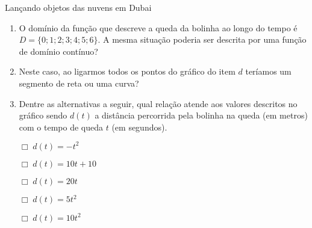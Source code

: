 \begin{task}{Lançando objetos das nuvens em Dubai}
\begin{enumerate}
\item {} 
O domínio da função que descreve a queda da bolinha ao longo do tempo é \(D = \{0 ; 1 ; 2 ; 3 ; 4 ; 5 ; 6 \}\). A mesma situação poderia ser descrita por uma função de domínio contínuo?

\item {} 
Neste caso, ao ligarmos todos os pontos do gráfico do item \(d\) teríamos um segmento de reta ou uma curva?

\item {} 
Dentre as alternativas a seguir, qual relação atende aos valores descritos no gráfico sendo \(d(t)\) a distância percorrida pela bolinha na queda (em metros) com o tempo de queda \(t\) (em segundos).

\(\Box \; d(t)= -t^2\)

\(\Box \; d(t)= 10t+10\)

\(\Box \; d(t)= 20t\)

\(\Box \; d(t)= 5t^2\)

\(\Box \; d(t)= 10t^2\)

\end{enumerate}
\end{task}


